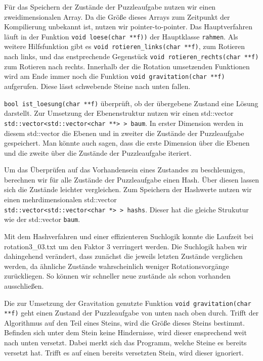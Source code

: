 	Für das Speichern der Zustände der Puzzleaufgabe nutzen wir einen zweidimensionalen Array. 
	Da die Größe dieses Arrays zum Zeitpunkt der Kompilierung unbekannt ist, nutzen wir pointer-to-pointer.
	Das Hauptverfahren läuft in der Funktion \texttt{void loese(char **f))} der Hauptklasse \texttt{rahmen}.
  Als weitere Hilfsfunktion gibt es \texttt{void rotieren\_links(char **f)}, zum Rotieren nach links, 
	und das enstprechende Gegenstück \texttt{void rotieren\_rechts(char **f)} zum Rotieren nach rechts.
	Innerhalb der die Rotation umsetzenden Funktionen wird am Ende immer noch die Funktion \texttt{void gravitation(char **f)} aufgerufen.
	Diese lässt schwebende Steine nach unten fallen. 
	
	\texttt{bool ist\_loesung(char **f)} überprüft, ob der übergebene Zustand eine Lösung darstellt.
	Zur Umsetzung der Ebenenstruktur nutzen wir einen std::vector \\\texttt{std::vector<std::vector<char **> > baum}.
	In erster Dimension werden in diesem std::vector die Ebenen und in zweiter die Zustände der Puzzleaufgabe gespeichert. 
	Man könnte auch sagen, dass die erste Dimension über die Ebenen und die zweite über die Zustände der Puzzleaufgabe iteriert.

	Um das Überprüfen auf das Vorhandensein eines Zustandes zu beschleunigen, berechnen wir für alle Zustände der Puzzleaufgabe einen Hash.
	Über diesen lassen sich  die Zustände leichter vergleichen. Zum Speichern der Hashwerte nutzen 
	wir einen mehrdimensionalen std::vector \\\texttt{std::vector<std::vector<char *> > hashs}. Dieser hat die gleiche Strukutur wie der std::vector \texttt{baum}.
	
	Mit dem Hashverfahren und einer effizienteren Suchlogik konnte die Laufzeit bei rotation3\_03.txt um den Faktor 3 verringert werden.
 	Die Suchlogik haben wir dahingehend verändert, dass zunächst die jeweils letzten Zustände verglichen werden, da ähnliche Zustände wahrscheinlich weniger Rotationsvorgänge zurückliegen. So können wir schneller neue zustände als schon vorhanden ausschließen.
	
	Die zur Umsetzung der Gravitation genutzte Funktion \texttt{void gravitation(char **f)} geht einen Zustand der Puzzleaufgabe von unten nach oben durch.
	Trifft der Algorithmus auf den Teil eines Steins, wird die Größe dieses Steins bestimmt. Befinden sich unter dem Stein keine Hindernisse, 
	wird dieser ensprechend weit nach unten versetzt. Dabei merkt sich das Programm, welche Steine es bereits versetzt hat. 
	Trifft es auf einen bereits versetzten Stein, wird dieser ignoriert.

 
	
	
